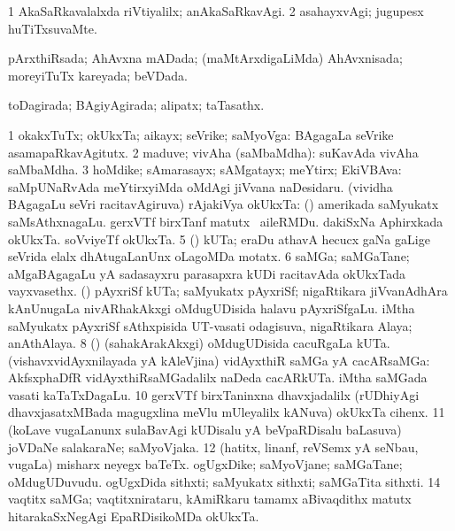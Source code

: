 \bentry
{} 
\gl{\kirxvi}
\expl{}
\bmng
\bnum
\num{1} AkaSaRkavalalxda riVtiyalilx; anAkaSaRkavAgi. 
\num{2} asahayxvAgi; jugupesx huTiTxsuvaMte. 
\enum
\emng
\eentry

\bentry
{} 
\gl{\gu}
\expl{}
\bmng
pArxthiRsada; AhAvxna mADada; (maMtArxdigaLiMda) AhAvxnisada; moreyiTuTx kareyada; beVDada. 
\emng
\eentry

\bentry
{} 
\gl{\gu}
\expl{}
\bmng
toDagirada; BAgiyAgirada; alipatx; taTasathx. 
\emng
\eentry

\bentry
{} 
\gl{\nA}
\expl{}
\bmng
\bnum
\num{1} okakxTuTx; okUkxTa; aikayx; seVrike; saMyoVga:  BAgagaLa seVrike asamapaRkavAgitutx. 
\num{2} maduve; vivAha (saMbaMdha):  suKavAda vivAha saMbaMdha. 
\num{3} hoMdike; sAmarasayx; sAMgatayx; meYtirx; EkiVBAva:  saMpUNaRvAda meYtirxyiMda oMdAgi jiVvana naDesidaru. 
 (vividha BAgagaLu seVri racitavAgiruva) rAjakiVya okUkxTa: 
\banum
{} (\kanmu) amerikada saMyukatx saMsAthxnagaLu. 
 gerxVTf birxTanf matutx \kanu\ aileRMDu. 
 dakiSxNa Aphirxkada okUkxTa. 
 soVviyeTf okUkxTa. 
\eanum
\numie
\num{5} (\ga) kUTa; eraDu athavA hecucx gaNa  gaLige seVrida elalx dhAtugaLanUnx oLagoMDa motatx. 
\num{6} saMGa; saMGaTane; aMgaBAgagaLu yA sadasayxru parasapxra kUDi racitavAda okUkxTada vayxvasethx. 
\banum
{} (\ca) pAyxriSf kUTa; saMyukatx pAyxriSf; nigaRtikara jiVvanAdhAra kAnUnugaLa nivARhakAkxgi oMdugUDisida halavu pAyxriSfgaLu. 
\hypertarget{union(7)b}{} 
 iMtha saMyukatx pAyxriSf sAthxpisida UT-vasati odagisuva, nigaRtikara Alaya; anAthAlaya. 
\eanum
\numie
\num{8} (\birx) (sahakArakAkxgi) oMdugUDisida cacuRgaLa kUTa. 
\banum
{} (vishavxvidAyxnilayada yA kAleVjina) vidAyxthiR saMGa yA cacARsaMGa:  AkfsxphaDfR vidAyxthiRsaMGadalilx naDeda cacARkUTa. 
 iMtha saMGada vasati kaTaTxDagaLu. 
\eanum
\numie
\num{10} gerxVTf birxTaninxna dhavxjadalilx (rUDhiyAgi dhavxjasatxMBada magugxlina meVlu mUleyalilx kANuva) okUkxTa cihenx. 
\num{11} (koLave \mo vugaLanunx sulaBavAgi kUDisalu yA beVpaRDisalu baLasuva) joVDaNe salakaraNe; saMyoVjaka.  
\num{12} (hatitx, linanf, reVSemx yA seNbau, \mo vugaLa) misharx neyegx baTeTx. 
\banum
{} ogUgxDike; saMyoVjane; saMGaTane; oMdugUDuvudu. 
 ogUgxDida sithxti; saMyukatx sithxti; saMGaTita sithxti. 
\eanum
\numie
\num{14} vaqtitx saMGa; vaqtitxnirataru, kAmiRkaru tamamx aBivaqdithx matutx hitarakaSxNegAgi EpaRDisikoMDa okUkxTa. 
\enum
\emng

